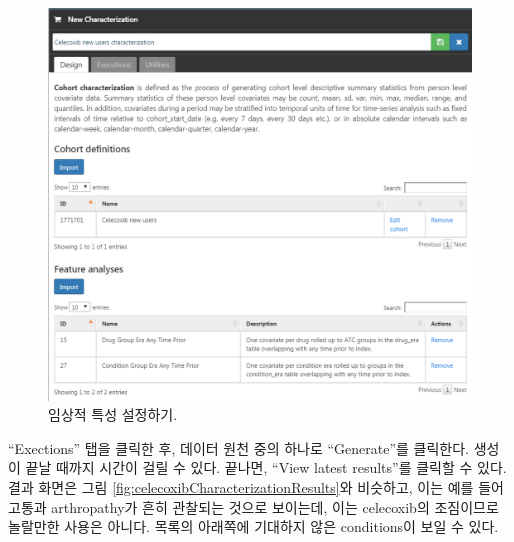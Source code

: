 \documentclass[10.5pt]{book}
\theoremstyle{definition}
\theoremstyle{definition}
\theoremstyle{definition}
\theoremstyle{remark}
\begin{document}
\begin{figure}

{\centering \includegraphics[width=1\linewidth]{images/SuggestedAnswers/celecoxibCharacterization} 

}

\caption{임상적 특성 설정하기.}\label{fig:celecoxibCharacterization}
\end{figure}

``Exections'' 탭을 클릭한 후, 데이터 원천 중의 하나로 ``Generate''를
클릭한다. 생성이 끝날 때까지 시간이 걸릴 수 있다. 끝나면, ``View latest
results''를 클릭할 수 있다. 결과 화면은 그림
\ref{fig:celecoxibCharacterizationResults}와 비슷하고, 이는 예를 들어
고통과 arthropathy가 흔히 관찰되는 것으로 보이는데, 이는 celecoxib의
조짐이므로 놀랄만한 사용은 아니다. 목록의 아래쪽에 기대하지 않은
conditions이 보일 수 있다.
\end{document}
